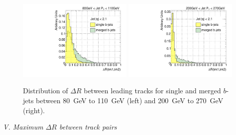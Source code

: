 \begin{figure}[tp]
\centering
\includegraphics[width=0.49\textwidth]{FIGS/VarsSingleMerged/DRtrk12080.pdf}
\includegraphics[width=0.49\textwidth]{FIGS/VarsSingleMerged/DRtrk12200.pdf}
\caption{Distribution of $\Delta R$ between leading tracks for single and merged $b$-jets between 80~GeV to 110~GeV (left) and 200~GeV to 270~GeV (right).}
\label{fig:drtrk12singlemerged}
\end{figure}

{ \em V. Maximum $\Delta R$ between track pairs}
\vspace{3 mm}

